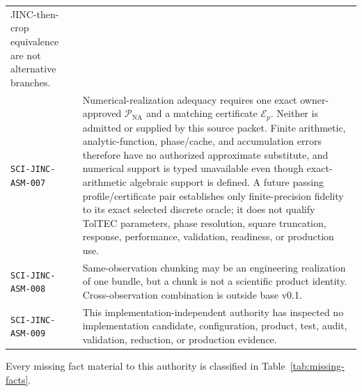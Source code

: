 \begin{longtable}{@{}>{\raggedright\arraybackslash}p{}
                        >{\raggedright\arraybackslash}p{}@{}}
JINC-then-crop equivalence are not alternative branches. \\
\texttt{SCI-JINC-ASM-007} & Numerical-realization adequacy requires one exact
owner-approved $\mathcal{P}_{\mathrm{NA}}$ and a matching certificate
$\mathcal{E}_p$.  Neither is admitted or supplied by this source packet.
Finite arithmetic, analytic-function, phase/cache, and accumulation errors
therefore have no authorized approximate substitute, and numerical support is
typed unavailable even though exact-arithmetic algebraic support is defined.
A future passing profile/certificate pair establishes only finite-precision
fidelity to its exact selected discrete oracle; it does not qualify TolTEC
parameters, phase resolution, square truncation, response, performance,
validation, readiness, or production use. \\
\texttt{SCI-JINC-ASM-008} & Same-observation chunking may be an engineering
realization of one bundle, but a chunk is not a scientific product identity.
Cross-observation combination is outside base v0.1. \\
\texttt{SCI-JINC-ASM-009} & This implementation-independent authority has
inspected no implementation
candidate, configuration, product, test, audit, validation, reduction, or
production evidence. \\
\bottomrule
\end{longtable}

Every missing fact material to this authority is classified in
Table~\ref{tab:missing-facts}.

